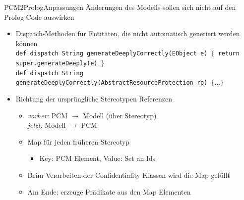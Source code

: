 \documentclass{sdqbeamer}
\begin{document}
\begin{frame}{PCM2Prolog}{Anpassungen}
	Änderungen des Modells sollen sich nicht auf den Prolog Code auswirken
	\vspace{0.05\textheight}
	\begin{itemize}
		\item Dispatch-Methoden für Entitäten, die nicht automatisch generiert werden können \\ \vspace{0.025\textheight}
		\texttt{def dispatch String generateDeeplyCorrectly(EObject e) $\{$
				return super.generateDeeply(e)
		$\}$}\\
		\texttt{def dispatch String generateDeeplyCorrectly(AbstractResourceProtection rp) $\{...\}$} \\ \vspace{0.025\textheight}
		\item Richtung der ursprüngliche Stereotypen Referenzen
		\begin{itemize}
			\item \textit{vorher:} PCM $\rightarrow$ Modell (über Stereotyp) \\
			\textit{jetzt:}\hspace{0.019\textwidth} Modell $\rightarrow$ PCM
			\vspace{0.02\textheight}
			\item Map für jeden früheren Stereotyp
			\begin{itemize}
				\item Key: PCM Element, Value: Set an Ids
			\end{itemize}
			\item Beim Verarbeiten der Confidentiality Klassen wird die Map gefüllt
			\item Am Ende: erzeuge Prädikate aus den Map Elementen
		\end{itemize}
	\end{itemize}
\end{frame}
\end{document}
